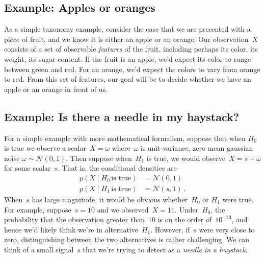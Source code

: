 \documentclass{tufte-book}
\begin{document}
\hypertarget{example-apples-or-oranges}{%
\subsection{Example: Apples or
oranges}\label{example-apples-or-oranges}}

As a simple taxonomy example, consider the case that we are presented
with a piece of fruit, and we know it is either an apple or an orange.
Our observation~\(X\) consists of a set of observable \emph{features} of
the fruit, including perhaps its color, its weight, its sugar content.
If the fruit is an apple, we'd expect its color to range between green
and red. For an orange, we'd expect the colors to vary from orange to
red. From this set of features, our goal will be to decide whether we
have an apple or an orange in front of us.

\hypertarget{example-is-there-a-needle-in-my-haystack}{%
\subsection{Example: Is there a needle in my
haystack?}\label{example-is-there-a-needle-in-my-haystack}}

For a simple example with more mathematical formalism, suppose that when
\(H_0\) is true we observe a scalar~\(X=\omega\) where~\(\omega\) is
unit-variance, zero mean gaussian noise
\(\omega\sim \mathcal{N}(0,1)\).
Then suppose when~\(H_1\) is true, we would observe~\(X=s+\omega\) for
some scalar~\(s\). That is, the conditional densities are \[
\begin{aligned}
    p(X\mid H_0\,\text{is true}) &= \mathcal{N}(0,1)\\
    p(X\mid H_1\,\text{is true}) &= \mathcal{N}(s,1)\,.
\end{aligned}
\] When~\(s\) has large magnitude, it would be obvious whether~\(H_0\)
or \(H_1\) were true. For example, suppose~\(s=10\) and we
observed~\(X=11\). Under~\(H_0\), the probability that the observation
greater than~\(10\) is on the order of~\(10^{-23}\), and hence we'd
likely think we're in alternative~\(H_1\). However, if~\(s\) were very
close to zero, distinguishing between the two alternatives is rather
challenging. We can think of a small signal~\(s\) that we're trying to
detect as a \emph{needle in a haystack}.
\end{document}
